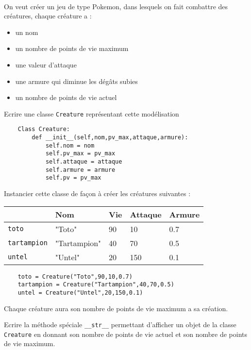 \documentclass[11pt,a4paper]{article}
\begin{document}
\vspace{0.2cm}

 \\
On veut créer un jeu de type Pokemon, dans lesquels on fait combattre des créatures, chaque créature a :
\begin{itemize}
\item un nom
\item un nombre de points de vie maximum
\item une valeur d'attaque
\item une armure qui diminue les dégâts subies
\item un nombre de points de vie actuel
\end{itemize}
\QListe
\item Ecrire une classe {\tt Creature} représentant cette modélisation
\begin{lstlisting}
    Class Creature:
        def __init__(self,nom,pv_max,attaque,armure):
            self.nom = nom
            self.pv_max = pv_max
            self.attaque = attaque
            self.armure = armure
            self.pv = pv_max
\end{lstlisting}
\item Instancier cette classe de façon à créer les créatures suivantes :  
\begin{center}
\begin{tabularx}{0.7\textwidth}{|X|X|p{1.5cm}|p{1.5cm}|p{1.5cm}|}
        \cline{2-5}
        \multicolumn{1}{c|}{} & Nom & Vie & Attaque & Armure \\
        \hline
        {\tt toto} & "Toto" & 90 & 10 & 0.7 \\
        \hline
        {\tt tartampion} & "Tartampion" & 40 & 70 & 0.5 \\
        \hline
        {\tt untel} & "Untel" & 20 & 150 & 0.1   \\
        \hline
\end{tabularx}
\end{center}
\begin{lstlisting}
    toto = Creature("Toto",90,10,0.7)
    tartampion = Creature("Tartampion",40,70,0.5)
    untel = Creature("Untel",20,150,0.1)
\end{lstlisting}
Chaque créature aura son nombre de points de vie maximum a sa création.
\item Ecrire  la méthode spéciale {\tt \_\_str\_\_} permettant d'afficher un objet de la classe {\tt Creature} en donnant son nombre de points de vie actuel et son nombre de points de vie maximum.
\end{document}
